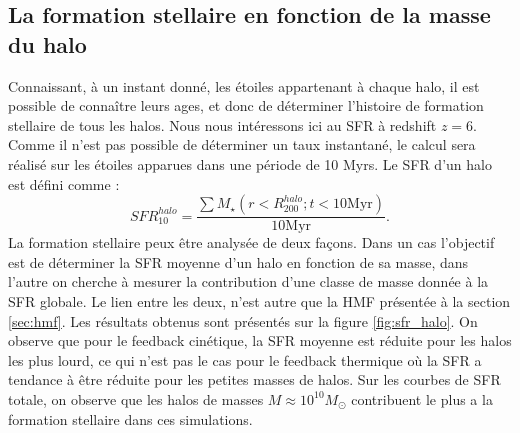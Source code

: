 \subsection{La formation stellaire en fonction de la masse du halo}
\label{sec:sfr_halo}
Connaissant, à un instant donné, les étoiles appartenant à chaque halo, il est possible de connaître leurs ages, et donc de déterminer l'histoire de formation stellaire de tous les halos.
Nous nous intéressons ici au \ac{SFR} à redshift $z=6$.
Comme il n'est pas possible de déterminer un taux instantané, le calcul sera réalisé sur les étoiles apparues dans une période de 10 Myrs.
Le \ac{SFR} d'un halo est défini comme :
\begin{equation}
	SFR_{10}^{halo} = \frac{ \sum M_{\star} \left( r<R_{200}^{halo}; t<10\mathrm{Myr}\right) }{10\mathrm{Myr}}.
\end{equation}
La formation stellaire peux être analysée de deux façons.
Dans un cas l'objectif est de déterminer la \ac{SFR} moyenne d'un halo en fonction de sa masse, dans l'autre on cherche à mesurer la contribution d'une classe de masse donnée à la \ac{SFR} globale.
Le lien entre les deux, n'est autre que la \ac{HMF} présentée à la section \ref{sec:hmf}.
Les résultats obtenus sont présentés sur la figure \ref{fig:sfr_halo}.
On observe que pour le feedback cinétique, la \ac{SFR} moyenne est réduite pour les halos les plus lourd, ce qui n'est pas le cas pour le feedback thermique où la \ac{SFR} a tendance à être réduite pour les petites masses de halos.
Sur les courbes de \ac{SFR} totale, on observe que les halos de masses $M\approx10^{10}M_\odot$ contribuent le plus a la formation stellaire dans ces simulations.

